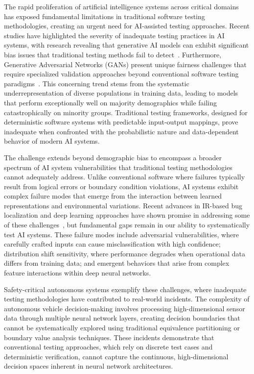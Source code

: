 \documentclass[manuscript,screen,review]{acmart}
\begin{document}
The rapid proliferation of artificial intelligence systems across critical domains has exposed fundamental limitations in traditional software testing methodologies, creating an urgent need for AI-assisted testing approaches. Recent studies have highlighted the severity of inadequate testing practices in AI systems, with research revealing that generative AI models can exhibit significant bias issues that traditional testing methods fail to detect~\cite{Zhou2024}. Furthermore, Generative Adversarial Networks (GANs) present unique fairness challenges that require specialized validation approaches beyond conventional software testing paradigms~\cite{Kenfack2021}. This concerning trend stems from the systematic underrepresentation of diverse populations in training data, leading to models that perform exceptionally well on majority demographics while failing catastrophically on minority groups. Traditional testing frameworks, designed for deterministic software systems with predictable input-output mappings, prove inadequate when confronted with the probabilistic nature and data-dependent behavior of modern AI systems.

The challenge extends beyond demographic bias to encompass a broader spectrum of AI system vulnerabilities that traditional testing methodologies cannot adequately address. Unlike conventional software where failures typically result from logical errors or boundary condition violations, AI systems exhibit complex failure modes that emerge from the interaction between learned representations and environmental variations. Recent advances in IR-based bug localization and deep learning approaches have shown promise in addressing some of these challenges~\cite{Li2024}, but fundamental gaps remain in our ability to systematically test AI systems. These failure modes include adversarial vulnerabilities, where carefully crafted inputs can cause misclassification with high confidence; distribution shift sensitivity, where performance degrades when operational data differs from training data; and emergent behaviors that arise from complex feature interactions within deep neural networks.

Safety-critical autonomous systems exemplify these challenges, where inadequate testing methodologies have contributed to real-world incidents. The complexity of autonomous vehicle decision-making involves processing high-dimensional sensor data through multiple neural network layers, creating decision boundaries that cannot be systematically explored using traditional equivalence partitioning or boundary value analysis techniques. These incidents demonstrate that conventional testing approaches, which rely on discrete test cases and deterministic verification, cannot capture the continuous, high-dimensional decision spaces inherent in neural network architectures.
\end{document}
